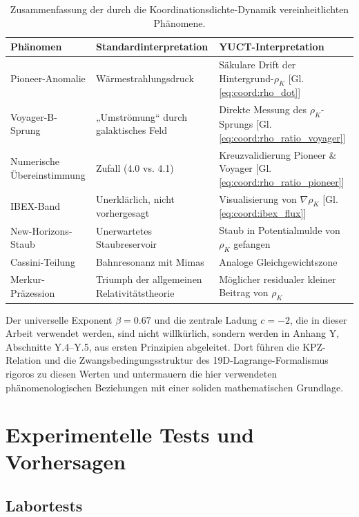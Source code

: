\documentclass[12pt,a4paper]{article}
\theoremstyle{remark}
\begin{document}
	\begin{table}[htbp]
		\centering
		\caption{Zusammenfassung der durch die Koordinationsdichte-Dynamik vereinheitlichten Phänomene.}
		\label{tab:coord:summary}
		\begin{tabular}{|p{4.5cm}|p{4.5cm}|p{5cm}|}
			\hline
			\textbf{Phänomen} & \textbf{Standardinterpretation} & \textbf{YUCT-Interpretation} \\
			\hline
			Pioneer-Anomalie & Wärmestrahlungsdruck & Säkulare Drift der Hintergrund-$\rho_K$ [Gl. \ref{eq:coord:rho_dot}] \\
			\hline
			Voyager-B-Sprung & „Umströmung“ durch galaktisches Feld & Direkte Messung des $\rho_K$-Sprungs [Gl. \ref{eq:coord:rho_ratio_voyager}] \\
			\hline
			Numerische Übereinstimmung & Zufall (4.0 vs. 4.1) & Kreuzvalidierung Pioneer \& Voyager [Gl. \ref{eq:coord:rho_ratio_pioneer}] \\
			\hline
			IBEX-Band & Unerklärlich, nicht vorhergesagt & Visualisierung von $\nabla \rho_K$ [Gl. \ref{eq:coord:ibex_flux}] \\
			\hline
			New-Horizons-Staub & Unerwartetes Staubreservoir & Staub in Potentialmulde von $\rho_K$ gefangen \\
			\hline
			Cassini-Teilung & Bahnresonanz mit Mimas & Analoge Gleichgewichtszone \\
			\hline
			Merkur-Präzession & Triumph der allgemeinen Relativitätstheorie & Möglicher residualer kleiner Beitrag von $\rho_K$ \\
			\hline
		\end{tabular}
	\end{table}
	
	Der universelle Exponent $\beta = 0.67$ und die zentrale Ladung $c = -2$, die in dieser Arbeit verwendet werden, sind nicht willkürlich, sondern werden in Anhang Y, Abschnitte Y.4–Y.5, aus ersten Prinzipien abgeleitet. Dort führen die KPZ-Relation und die Zwangsbedingungsstruktur des 19D-Lagrange-Formalismus rigoros zu diesen Werten und untermauern die hier verwendeten phänomenologischen Beziehungen mit einer soliden mathematischen Grundlage.
	
	\section{Experimentelle Tests und Vorhersagen}
	\label{sec:experimental-tests}
	
	\subsection{Labortests}
	
\end{document}
